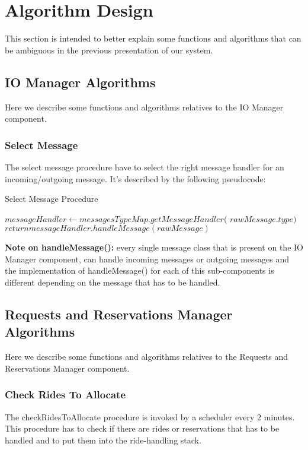 \documentclass[../../dd.tex]{subfiles}
\begin{document}
	\chapter{Algorithm Design}
		This section is intended to better explain some functions and algorithms that can be ambiguous in the previous presentation of our system.

		\section{IO Manager Algorithms}
			Here we describe some functions and algorithms relatives to the IO Manager component.
			\subsection{Select Message}
				The select message procedure have to select the right message handler for an incoming/outgoing message.
				It's described by the following pseudocode:

				\begin{algorithm}
					\caption{Select Message Procedure}\label{alg:selectMessage}
					\begin{algorithmic}[1]
						\State $messageHandler\gets messagesTypeMap.getMessageHandler($
						\State $rawMessage.type)$
						\State $return messageHandler.handleMessage(rawMessage)$
					\EndProcedure
					\end{algorithmic}
				\end{algorithm}

				\textbf{Note on handleMessage():} every single message class that is present on the IO Manager component, can handle incoming messages or outgoing messages and the implementation of handleMessage() for each of this sub-components is different depending on the message that has to be handled.

		\section{Requests and Reservations Manager Algorithms}
			Here we describe some functions and algorithms relatives to the Requests and Reservations Manager component.

			\subsection{Check Rides To Allocate}
				The checkRidesToAllocate procedure is invoked by a scheduler every 2 minutes.
				This procedure has to check if there are rides or reservations that has to be handled and to put them into the ride-handling stack.
\end{document}
